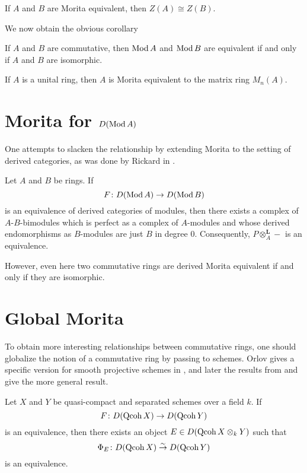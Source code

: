 \documentclass[reqno, 12pt]{amsart}
\begin{document}
\begin{corollary}\label{cor: morita implies isomorphic centers}
  If $A$ and $B$ are Morita equivalent, then $Z(A) \cong Z(B)$.
\end{corollary}

We now obtain the obvious corollary
\begin{corollary}
  If $A$ and $B$ are commutative, then $\operatorname{Mod}A$ and $\operatorname{Mod}B$ are equivalent if and only if $A$ and $B$ are isomorphic.
\end{corollary}

\begin{corollary}\label{cor: morita example}
  If $A$ is a unital ring, then $A$ is Morita equivalent to the matrix ring $M_n(A)$.
\end{corollary}

\section{Morita for $D(\operatorname{Mod}A)$}

One attempts to slacken the relationship by extending Morita to the setting of derived categories, as was done by Rickard in \cite{JR89}.
\begin{theorem}
  Let $A$ and $B$ be rings.  If
  $$F \colon D(\operatorname{Mod}A) \to D(\operatorname{Mod}B)$$
  is an equivalence of derived categories of modules, then there exists a complex of $A$-$B$-bimodules which is perfect as a complex of $A$-modules and whose derived endomorphisms as $B$-modules are just $B$ in degree 0.
  Consequently, $P \otimes^\mathbf{L}_A -$ is an equivalence.
\end{theorem}

However, even here two commutative rings are derived Morita equivalent if and only if they are isomorphic.

\section{Global Morita}
To obtain more interesting relationships between commutative rings, one should globalize the notion of a commutative ring by passing to schemes.
Orlov gives a specific version for smooth projective schemes in \cite{Orlov}, and later the results from \cite{Toen} and \cite{Lunts Orlov} give the more general result.

\begin{theorem}
  Let $X$ and $Y$ be quasi-compact and separated schemes over a field $k$.
  If
  $$F \colon D(\operatorname{Qcoh}X) \to D(\operatorname{Qcoh}Y)$$
  is an equivalence, then there exists an object $E \in D(\operatorname{Qcoh}X \otimes_k Y)$ such that
  $$\Phi_E \colon D(\operatorname{Qcoh}X) \overset{\sim}\to D(\operatorname{Qcoh}Y)$$
  is an equivalence.
\end{theorem}
\end{document}
